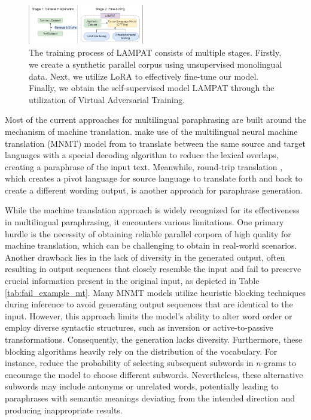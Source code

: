 \documentclass[letterpaper]{article} %
\begin{document}
\begin{figure}[h]
    \centering
    \includegraphics[width=0.45\textwidth]{images/rebuttal-overview_figure_2.drawio.png}
    \caption{The training process of LAMPAT consists of multiple stages. Firstly, we create a synthetic parallel corpus using unsupervised monolingual data. Next, we utilize LoRA to effectively fine-tune our model. Finally, we obtain the self-supervised model LAMPAT through the utilization of Virtual Adversarial Training.}
    \label{fig:lampat-architecture}
\end{figure}

Most of the current approaches for multilingual paraphrasing are built around the mechanism of machine translation. \citet{thompson-post-2020-paraphrase} make use of the multilingual neural machine translation (MNMT) model from \citet{thompson-post-2020-automatic} to translate between the same source and target languages with a special decoding algorithm to reduce the lexical overlaps, creating a paraphrase of the input text. Meanwhile, round-trip translation \citep{federmann-etal-2019-multilingual}, which creates a pivot language for source language to translate forth and back to create a different wording output, is another approach for paraphrase generation. 

While the machine translation approach is widely recognized for its effectiveness in multilingual paraphrasing, it encounters various limitations. One primary hurdle is the necessity of obtaining reliable parallel corpora of high quality for machine translation, which can be challenging to obtain in real-world scenarios. Another drawback lies in the lack of diversity in the generated output, often resulting in output sequences that closely resemble the input and fail to preserve crucial information present in the original input, as depicted in Table \ref{tab:fail_example_mt}. Many MNMT models utilize heuristic blocking techniques during inference to avoid generating output sequences that are identical to the input. However, this approach limits the model's ability to alter word order or employ diverse syntactic structures, such as inversion or active-to-passive transformations. Consequently, the generation lacks diversity. Furthermore, these blocking algorithms heavily rely on the distribution of the vocabulary. For instance, \citet{thompson-post-2020-paraphrase} reduce the probability of selecting subsequent subwords in $n$-grams to encourage the model to choose different subwords. Nevertheless, these alternative subwords may include antonyms or unrelated words, potentially leading to paraphrases with semantic meanings deviating from the intended direction and producing inappropriate results.
\end{document}

